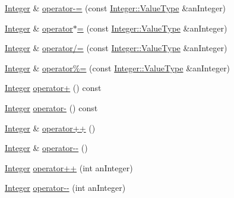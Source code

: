 \begin{DoxyCompactItemize}
\item 
\hyperlink{classlibrary_1_1core_1_1types_1_1_integer}{Integer} \& \hyperlink{classlibrary_1_1core_1_1types_1_1_integer_a3976d02296b294db2aa1b70164764fbc}{operator-\/=} (const \hyperlink{classlibrary_1_1core_1_1types_1_1_integer_a623afb1580f870fd8a1997b1c12c917d}{Integer\+::\+Value\+Type} \&an\+Integer)
\item 
\hyperlink{classlibrary_1_1core_1_1types_1_1_integer}{Integer} \& \hyperlink{classlibrary_1_1core_1_1types_1_1_integer_ac08d655daf7d75b22909e14aed294e7e}{operator$\ast$=} (const \hyperlink{classlibrary_1_1core_1_1types_1_1_integer_a623afb1580f870fd8a1997b1c12c917d}{Integer\+::\+Value\+Type} \&an\+Integer)
\item 
\hyperlink{classlibrary_1_1core_1_1types_1_1_integer}{Integer} \& \hyperlink{classlibrary_1_1core_1_1types_1_1_integer_a5358ac7b2be0f83ebd2fccb1e9593e24}{operator/=} (const \hyperlink{classlibrary_1_1core_1_1types_1_1_integer_a623afb1580f870fd8a1997b1c12c917d}{Integer\+::\+Value\+Type} \&an\+Integer)
\item 
\hyperlink{classlibrary_1_1core_1_1types_1_1_integer}{Integer} \& \hyperlink{classlibrary_1_1core_1_1types_1_1_integer_a88482e4677001d7d523f90ef28ac95f6}{operator\%=} (const \hyperlink{classlibrary_1_1core_1_1types_1_1_integer_a623afb1580f870fd8a1997b1c12c917d}{Integer\+::\+Value\+Type} \&an\+Integer)
\item 
\hyperlink{classlibrary_1_1core_1_1types_1_1_integer}{Integer} \hyperlink{classlibrary_1_1core_1_1types_1_1_integer_adaf665cd81d9befd1f764e11c2be9b69}{operator+} () const
\item 
\hyperlink{classlibrary_1_1core_1_1types_1_1_integer}{Integer} \hyperlink{classlibrary_1_1core_1_1types_1_1_integer_ad9670b50ae46bc0f09e4995e445dab99}{operator-\/} () const
\item 
\hyperlink{classlibrary_1_1core_1_1types_1_1_integer}{Integer} \& \hyperlink{classlibrary_1_1core_1_1types_1_1_integer_a5b6a30696dcea44bcf29e4bd0a01f490}{operator++} ()
\item 
\hyperlink{classlibrary_1_1core_1_1types_1_1_integer}{Integer} \& \hyperlink{classlibrary_1_1core_1_1types_1_1_integer_aa57a45cc369f42e8a5f98391e26b6549}{operator-\/-\/} ()
\item 
\hyperlink{classlibrary_1_1core_1_1types_1_1_integer}{Integer} \hyperlink{classlibrary_1_1core_1_1types_1_1_integer_a10dd68fe912b11ba68840f9c1fdb6ffa}{operator++} (int an\+Integer)
\item 
\hyperlink{classlibrary_1_1core_1_1types_1_1_integer}{Integer} \hyperlink{classlibrary_1_1core_1_1types_1_1_integer_ad8889e78cffb5b540d2f69d36d36e049}{operator-\/-\/} (int an\+Integer)

\end{DoxyCompactItemize}
